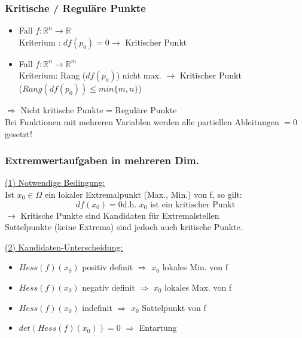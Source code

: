 \documentclass[6pt]{article}
\begin{document}
\begin{multicols*}{3}
	
	\pagebreak
	\subsubsection*{Kritische / Regul{\"a}re Punkte}
	\begin{itemize}[itemsep=3pt, parsep=2pt, leftmargin=*,align=left]
		\item Fall $f: \mathbb{R}^n \to \mathbb{R} $   \\
				Kriterium : $df(p_0)=0 \rightarrow$ Kritischer Punkt	
					                                                                                                                                                                                                                      
		\item Fall $f: \mathbb{R}^n \to \mathbb{R}^m $ \\
			Kriterium: Rang ($df(p_0)$) nicht max. $\rightarrow$ Kritischer Punkt\\
			 ($Rang(df(p_0)) \leq min\{m,n\}$)
	\end{itemize}
	
	$\Rightarrow $ Nicht kritische Punkte = Regul{\"a}re Punkte \\
	
	Bei Funktionen mit mehreren Variablen werden alle partiellen Ableitungen $= 0$ gesetzt!
	
	\subsubsection*{Extremwertaufgaben in mehreren Dim.}
	\underline{(1) Notwendige Bedingung:} \vspace{1mm}\\
	Ist $x_0 \in \Omega$ ein lokaler Extremalpunkt (Max., Min.) von f, so gilt: \\
	\[
		df(x_0)=0 \text{d.h. $x_0$ ist ein kritischer Punkt}
	\]
	$\rightarrow$ Kritische Punkte sind Kandidaten f{\"u}r Extremalstellen\\
	 Sattelpunkte (keine Extrema) sind jedoch auch kritische Punkte.
	
	\vspace{3mm}
	\underline{(2) Kandidaten-Unterscheidung:} 
	\begin{itemize}[itemsep=2pt, parsep=2pt]
		\item $Hess(f)(x_0)$ positiv definit $\Rightarrow$ $x_0$	lokales Min. von f
		\item $Hess(f)(x_0)$ negativ definit  $\Rightarrow$ $x_0$ lokales Max. von f
		\item $Hess(f)(x_0)$ indefinit $\Rightarrow$ $x_0$	Sattelpunkt von  f
		\item $ det(Hess(f)(x_0))=0 $ $\Rightarrow$ Entartung 
	\end{itemize}
	

\end{multicols*}
\end{document}
